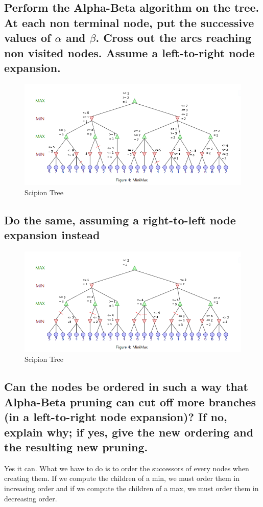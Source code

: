 \documentclass[a4paper,10pt]{article}
\begin{document}
		\subsection{Perform the Alpha-Beta algorithm on the tree. At each non terminal node, put the successive values of $\alpha$ and $\beta$. Cross out the arcs reaching non visited nodes. Assume a left-to-right node expansion.}
		\begin{figure}[h!]
			\centering
				\includegraphics[scale=0.8]{tree-fig5.png}
			\caption{Scipion Tree}
			\label{fig:server_connection}	
		\end{figure}
		\subsection{Do the same, assuming a right-to-left node expansion instead}
		\begin{figure}[h!]
			\centering
				\includegraphics[scale=0.8]{tree-fig6.png}
			\caption{Scipion Tree}
			\label{fig:server_connection}	
		\end{figure}
		\subsection{Can the nodes be ordered in such a way that Alpha-Beta pruning can cut off more branches (in a left-to-right node expansion)? If no, explain why; if yes,
give the new ordering and the resulting new pruning.}
		Yes it can. What we have to do is to order the successors of every nodes when creating them. If we compute the children of a min, we must order them in increasing order and if we compute the children of a max, we must order them in decreasing order.
\end{document}
